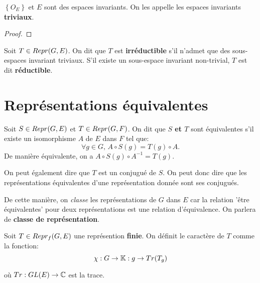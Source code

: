 \begin{proposition}
	$\left\{ O_{E} \right\}$ et $E$ sont des espaces invariants. On les appelle
	les espaces invariants \textbf{triviaux}.
\end{proposition}

\begin{proof}
	
\end{proof}

\begin{definition} 
	Soit $T \in Repr(G, E)$. On dit que $T$ est \textbf{irréductible} s'il
	n'admet que des sous-espaces invariant triviaux. S'il existe un sous-espace
	invariant non-trivial, $T$ est dit \textbf{réductible}.
\end{definition}

\section{Représentations équivalentes}

\begin{definition}
	Soit $S \in Repr(G, E)$ et $T \in Repr(G, F)$.
	On dit que \textbf{$S$ et $T$} sont équivalentes s'il existe un isomorphisme
	$A$ de $E$ dans $F$ tel que:
	\begin{equation}
		\forall g \in G, \, A \circ S(g) = T(g) \circ A.
	\end{equation}
	De manière équivalente, on a $A \circ S(g) \circ A^{-1} = T(g)$.
	
	On peut également dire que $T$ est un conjugué de $S$. On peut donc dire que
	les représentations équivalentes d'une représentation donnée sont ses
	conjugués.
\end{definition}

De cette manière, on \textit{classe} les représentations de $G$ dans $E$ car la
relation 'être équivalentes' pour deux représentations est une relation
d'équivalence. On parlera de \textbf{classe de représentation}.

\begin{definition}
	Soit $T \in Repr_{f}(G, E)$ une représention \textbf{finie}.
	On définit le caractère de $T$ comme la fonction:
	\begin{equation}
		\chi : G \rightarrow \mathbb{K} : g \rightarrow Tr(T_{g})
	\end{equation}

	où $Tr : GL(E) \rightarrow \mathbb{C}$ est la trace.
\end{definition}

